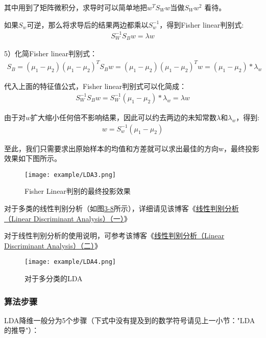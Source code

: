 其中用到了矩阵微积分，求导时可以简单地把$w^TS_Ww$当做$S_Ww^2$ 看待。

如果$S_w$可逆，那么将求导后的结果两边都乘以$S_w^{-1}$，得到Fisher linear判别式:
\begin{eqnarray}
S_W^{-1} S_Bw = \lambda w
\end{eqnarray}

5）化简Fisher linear判别式：
\begin{eqnarray}
S_B = (\mu_1 - \mu_2)(\mu_1 - \mu_2)^T
S_B w = (\mu_1 - \mu_2)(\mu_1 - \mu_2)^Tw = (\mu_1 - \mu_2)* \lambda_w
\end{eqnarray}

代入上面的特征值公式，Fisher linear判别式可以化简成：
\begin{eqnarray}
S_W^{-1} S_B w = S_W^{-1} (\mu_1 - \mu_2)* \lambda_w = \lambda w
\end{eqnarray}

由于对$w$扩大缩小任何倍不影响结果，因此可以约去两边的未知常数$\lambda$和$\lambda_w$，得到:
\begin{eqnarray}
w = S_w^{-1}(\mu_1 - \mu_2)
\end{eqnarray}

至此，我们只需要求出原始样本的均值和方差就可以求出最佳的方向w，最终投影效果如下图所示。

\begin{figure}[!htp]
\centering
\texttt{[image: example/LDA3.png]}
\caption{Fisher Linear判别的最终投影效果}
\label{fig1:3-1}
\end{figure}

对于多类的线性判别分析（如图\href{figure:3-8}{3-8}所示），详细请见该博客《\href{https://www.cnblogs.com/jerrylead/archive/2011/04/21/2024384.html}{线性判别分析（Linear Discriminant Analysis）（一）}》

对于线性判别分析的使用说明，可参考该博客《\href{https://www.cnblogs.com/jerrylead/archive/2011/04/21/2024389.html}{线性判别分析（Linear Discriminant Analysis）（二）}》

\begin{figure}[!htp]
\centering
\texttt{[image: example/LDA4.png]}
\caption{对于多分类的LDA}
\label{fig1:3-8}
\end{figure}

\subsubsection{算法步骤}

LDA降维一般分为5个步骤（下式中没有提及到的数学符号请见上一小节："LDA 的推导"）：

